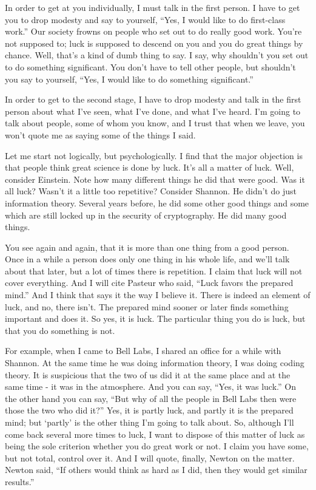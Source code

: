 \documentclass{article}
\begin{document}
In order to get at you individually, I must talk in the first person. I have to get you to drop modesty and say to yourself, ``Yes, I would like to do first-class work.'' Our society frowns on people who set out to do really good work. You're not supposed to; luck is supposed to descend on you and you do great things by chance. Well, that's a kind of dumb thing to say. I say, why shouldn't you set out to do something significant. You don't have to tell other people, but shouldn't you say to yourself, ``Yes, I would like to do something significant.''

In order to get to the second stage, I have to drop modesty and talk in the first person about what I've seen, what I've done, and what I've heard. I'm going to talk about people, some of whom you know, and I trust that when we leave, you won't quote me as saying some of the things I said.

Let me start not logically, but psychologically. I find that the major objection is that people think great science is done by luck. It's all a matter of luck. Well, consider Einstein. Note how many different things he did that were good. Was it all luck? Wasn't it a little too repetitive? Consider Shannon. He didn't do just information theory. Several years before, he did some other good things and some which are still locked up in the security of cryptography. He did many good things.

You see again and again, that it is more than one thing from a good person. Once in a while a person does only one thing in his whole life, and we'll talk about that later, but a lot of times there is repetition. I claim that luck will not cover everything. And I will cite Pasteur who said, ``Luck favors the prepared mind.'' And I think that says it the way I believe it. There is indeed an element of luck, and no, there isn't. The prepared mind sooner or later finds something important and does it. So yes, it is luck. The particular thing you do is luck, but that you do something is not.

For example, when I came to Bell Labs, I shared an office for a while with Shannon. At the same time he was doing information theory, I was doing coding theory. It is suspicious that the two of us did it at the same place and at the same time - it was in the atmosphere. And you can say, ``Yes, it was luck.'' On the other hand you can say, ``But why of all the people in Bell Labs then were those the two who did it?'' Yes, it is partly luck, and partly it is the prepared mind; but `partly' is the other thing I'm going to talk about. So, although I'll come back several more times to luck, I want to dispose of this matter of luck as being the sole criterion whether you do great work or not. I claim you have some, but not total, control over it. And I will quote, finally, Newton on the matter. Newton said, ``If others would think as hard as I did, then they would get similar results.''
\end{document}

